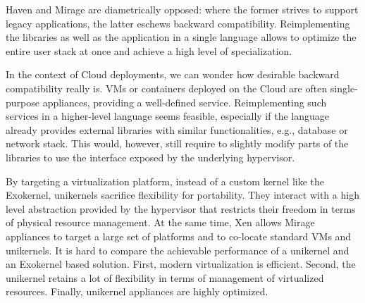 Haven and Mirage are diametrically opposed: where the former strives to support legacy applications, the latter eschews backward compatibility.
Reimplementing the libraries as well as the application in a single language allows to optimize the entire user stack at once and achieve a high level of specialization.

In the context of Cloud deployments, we can wonder how desirable backward compatibility really is.
VMs or containers deployed on the Cloud are often single-purpose appliances, providing a well-defined service.
Reimplementing such services in a higher-level language seems feasible, especially if the language already provides external libraries with similar functionalities, e.g., database or network stack.
This would, however, still require to slightly modify parts of the libraries to use the interface exposed by the underlying hypervisor.

By targeting a virtualization platform, instead of a custom kernel like the Exokernel, unikernels sacrifice flexibility for portability.
They interact with a high level abstraction provided by the hypervisor that restricts their freedom in terms of physical resource management.
At the same time, Xen allows Mirage appliances to target a large set of platforms and to co-locate standard VMs and unikernels.
It is hard to compare the achievable performance of a unikernel and an Exokernel based solution.
First, modern virtualization is efficient.
Second, the unikernel retains a lot of flexibility in terms of management of virtualized resources.
Finally, unikernel appliances are highly optimized.
